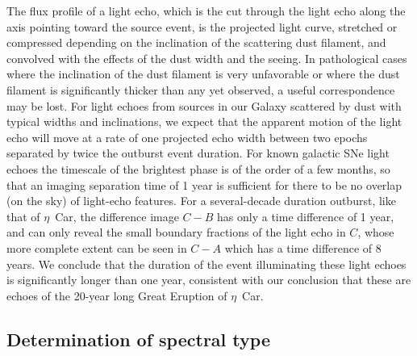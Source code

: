 The flux profile of a light echo, which is the cut through the light
echo along the axis pointing toward the source event, is the projected
light curve, stretched or compressed depending on the inclination of
the scattering dust filament, and convolved with the effects of the
dust width and the seeing\cite{Rest11_leprofile}.  In pathological
cases where the inclination of the dust filament is very unfavorable
or where the dust filament is significantly thicker than any yet
observed, a useful correspondence may be
lost\cite{Rest11_leprofile}. For light echoes from sources in our
Galaxy scattered by dust with typical widths and inclinations, we
expect that the apparent motion of the light echo will move at a rate
of one projected echo width between two epochs separated by twice the
outburst event duration. For known galactic SNe light echoes the
timescale of the brightest phase is of the order of a few months, so
that an imaging separation time of 1 year is sufficient for there to
be no overlap (on the sky) of light-echo
features\cite{Rest05b,Rest08b}.  For a several-decade duration
outburst, like that of $\eta$~Car, the difference image $C-B$ has only
a time difference of 1 year, and can only reveal the small boundary
fractions of the light echo in $C$, whose more complete extent can be
seen in $C-A$ which has a time difference of 8 years.  We conclude
that the duration of the event illuminating these light echoes is
significantly longer than one year, consistent with our conclusion
that these are echoes of the 20-year long Great Eruption of
$\eta$~Car.

\subsection{Determination of spectral type}

